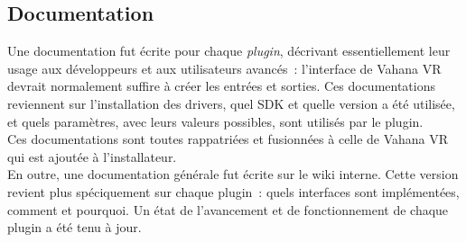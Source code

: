 \subsection{Documentation}
Une documentation fut écrite pour chaque \textit{plugin}, décrivant
essentiellement leur usage aux développeurs et aux utilisateurs avancés~: l'interface
de Vahana VR devrait normalement suffire à créer les entrées et sorties. Ces documentations
reviennent sur l'installation des drivers, quel SDK et quelle version a été utilisée,
et quels paramètres, avec leurs valeurs possibles, sont utilisés par le plugin.\\
Ces documentations sont toutes rappatriées et fusionnées à celle de Vahana VR 
qui est ajoutée à l'installateur.\\
\newline
En outre, une documentation générale fut écrite sur le wiki interne. Cette version revient
plus spéciquement sur chaque plugin~: quels interfaces sont implémentées, comment
et pourquoi. Un état de l'avancement et de fonctionnement de chaque plugin 
a été tenu à jour.

